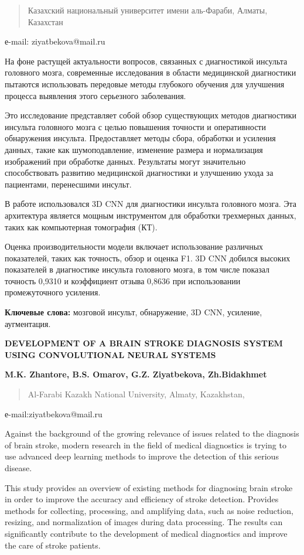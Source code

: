 \begin{quote}
Казахский национальный университет имени аль-Фараби, Алматы, Казахстан
\end{quote}

е-mail: ziyatbekova@mail.ru

На фоне растущей актуальности вопросов, связанных с диагностикой
инсульта головного мозга, современные исследования в области медицинской
диагностики пытаются использовать передовые методы глубокого обучения
для улучшения процесса выявления этого серьезного заболевания.

Это исследование представляет собой обзор существующих методов
диагностики инсульта головного мозга с целью повышения точности и
оперативности обнаружения инсульта. Предоставляет методы сбора,
обработки и усиления данных, такие как шумоподавление, изменение размера
и нормализация изображений при обработке данных. Результаты могут
значительно способствовать развитию медицинской диагностики и улучшению
ухода за пациентами, перенесшими инсульт.

В работе использовался 3D CNN для диагностики инсульта головного мозга.
Эта архитектура является мощным инструментом для обработки трехмерных
данных, таких как компьютерная томография (КТ).

Оценка производительности модели включает использование различных
показателей, таких как точность, обзор и оценка F1. 3D CNN добился
высоких показателей в диагностике инсульта головного мозга, в том числе
показал точность 0,9310 и коэффициент отзыва 0,8636 при использовании
промежуточного усиления.

\textbf{Ключевые слова:} мозговой инсульт, обнаружение, 3D CNN,
усиление, аугментация.

\textbf{DEVELOPMENT OF A BRAIN STROKE DIAGNOSIS SYSTEM USING
CONVOLUTIONAL NEURAL SYSTEMS}

\textbf{M.K. Zhantore, B.S. Omarov, G.Z. Ziyatbekova, Zh.Bidakhmet}

\begin{quote}
Al-Farabi Kazakh National University, Almaty, Kazakhstan,
\end{quote}

е-mail:ziyatbekova@mail.ru

Against the background of the growing relevance of issues related to the
diagnosis of brain stroke, modern research in the field of medical
diagnostics is trying to use advanced deep learning methods to improve
the detection of this serious disease.

This study provides an overview of existing methods for diagnosing brain
stroke in order to improve the accuracy and efficiency of stroke
detection. Provides methods for collecting, processing, and amplifying
data, such as noise reduction, resizing, and normalization of images
during data processing. The results can significantly contribute to the
development of medical diagnostics and improve the care of stroke
patients.

